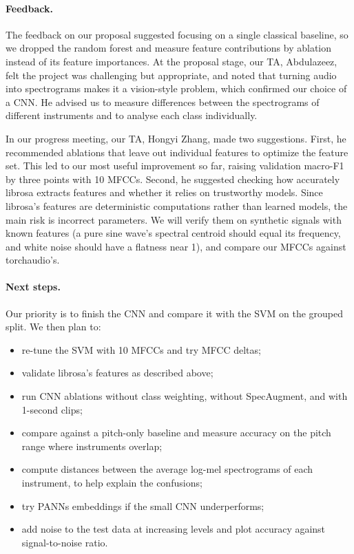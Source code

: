 \documentclass[11pt]{article}
\begin{document}
\paragraph{Feedback.} The feedback on our proposal suggested focusing on a single classical baseline, so we dropped the random forest and measure feature contributions by ablation instead of its feature importances. At the proposal stage, our TA, Abdulazeez, felt the project was challenging but appropriate, and noted that turning audio into spectrograms makes it a vision-style problem, which confirmed our choice of a CNN. He advised us to measure differences between the spectrograms of different instruments and to analyse each class individually.

In our progress meeting, our TA, Hongyi Zhang, made two suggestions. First, he recommended ablations that leave out individual features to optimize the feature set. This led to our most useful improvement so far, raising validation macro-F1 by three points with 10 MFCCs. Second, he suggested checking how accurately librosa extracts features and whether it relies on trustworthy models. Since librosa's features are deterministic computations rather than learned models, the main risk is incorrect parameters. We will verify them on synthetic signals with known features (a pure sine wave's spectral centroid should equal its frequency, and white noise should have a flatness near 1), and compare our MFCCs against torchaudio's.

\paragraph{Next steps.} Our priority is to finish the CNN and compare it with the SVM on the grouped split. We then plan to:
\begin{itemize}
  \item re-tune the SVM with 10 MFCCs and try MFCC deltas;
  \item validate librosa's features as described above;
  \item run CNN ablations without class weighting, without SpecAugment, and with 1-second clips;
  \item compare against a pitch-only baseline and measure accuracy on the pitch range where instruments overlap;
  \item compute distances between the average log-mel spectrograms of each instrument, to help explain the confusions;
  \item try PANNs embeddings if the small CNN underperforms;
  \item add noise to the test data at increasing levels and plot accuracy against signal-to-noise ratio.
\end{itemize}
\end{document}
